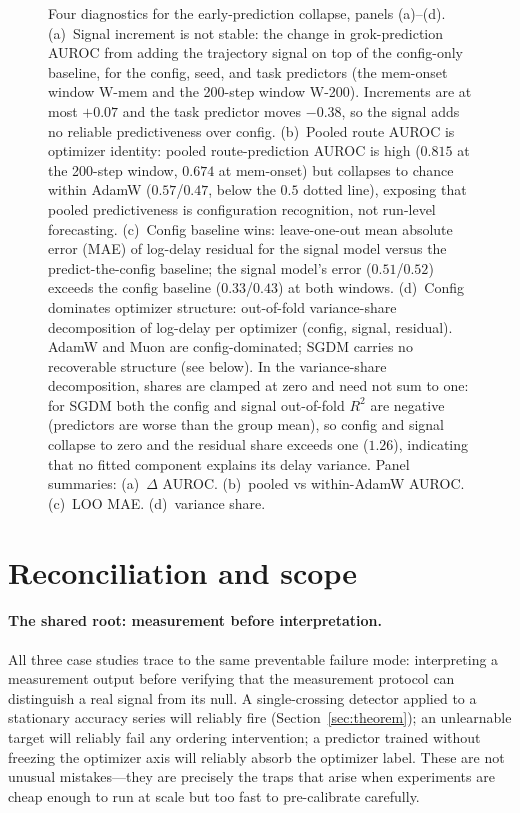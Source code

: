 \documentclass[11pt]{article}
\theoremstyle{plain}
\theoremstyle{definition}
\begin{document}
\begin{figure}[htbp]
\centering
{}
\caption{Four diagnostics for the early-prediction collapse, panels (a)--(d).
(a)~Signal increment is not stable: the change in grok-prediction AUROC from adding the
trajectory signal on top of the config-only baseline, for the config, seed, and task
predictors (the mem-onset window W-mem and the 200-step window W-200). Increments are at most $+0.07$ and the task
predictor moves $-0.38$, so the signal adds no reliable predictiveness over config.
(b)~Pooled route AUROC is optimizer identity: pooled route-prediction AUROC is high
($0.815$ at the 200-step window, $0.674$ at mem-onset) but collapses to chance within
AdamW ($0.57$/$0.47$, below the $0.5$ dotted line), exposing that pooled predictiveness
is configuration recognition, not run-level forecasting.
(c)~Config baseline wins: leave-one-out mean absolute error (MAE) of log-delay residual for the signal model
versus the predict-the-config baseline; the signal model's error ($0.51$/$0.52$) exceeds
the config baseline ($0.33$/$0.43$) at both windows.
(d)~Config dominates optimizer structure: out-of-fold variance-share decomposition of
log-delay per optimizer (config, signal, residual). AdamW and Muon are config-dominated;
SGDM carries no recoverable structure (see below).
In the variance-share decomposition, shares are clamped at zero and need not
sum to one: for SGDM both the config and signal out-of-fold $R^2$ are negative
(predictors are worse than the group mean), so config and signal collapse to zero and the
residual share exceeds one ($1.26$), indicating that no fitted component explains its
delay variance.
Panel summaries: (a)~$\Delta$ AUROC. (b)~pooled vs within-AdamW AUROC. (c)~LOO MAE. (d)~variance share.}
\label{fig:specroute}
\end{figure}

\section{Reconciliation and scope}\label{sec:discussion}

\paragraph{The shared root: measurement before interpretation.}
All three case studies trace to the same preventable failure mode: interpreting a measurement
output before verifying that the measurement protocol can distinguish a real signal from
its null.
A single-crossing detector applied to a stationary accuracy series
will reliably fire (Section~\ref{sec:theorem}); an unlearnable target will reliably fail any ordering
intervention; a predictor trained without freezing the optimizer axis will reliably
absorb the optimizer label.
These are not unusual mistakes---they are precisely the traps that arise when
experiments are cheap enough to run at scale but too fast to pre-calibrate carefully.
\end{document}

